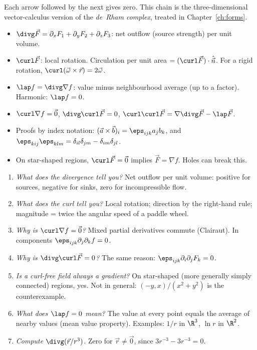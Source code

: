 Each arrow followed by the next gives zero. This chain is the three-dimensional vector-calculus version of the \emph{de~Rham complex}, treated in Chapter~\ref{ch:forms}.

\begin{summarybox}
\begin{itemize}
  \item $\divg\vec F=\partial_xF_1+\partial_yF_2+\partial_zF_3$: net outflow (source strength) per unit volume.
  \item $\curl\vec F$: local rotation. Circulation per unit area $=(\curl\vec F)\cdot\hat{\vec n}$. For a rigid rotation, $\curl(\vec\omega\times\vec r)=2\vec\omega$.
  \item $\lap f=\divg\nabla f$: value minus neighbourhood average (up to a factor). Harmonic: $\lap f=0$.
  \item $\curl\nabla f=\vec 0$, $\divg\curl\vec F=0$, $\curl\curl\vec F=\nabla\divg\vec F-\lap\vec F$.
  \item Proofs by index notation: $(\vec a\times\vec b)_i=\eps_{ijk}a_jb_k$, and $\eps_{kij}\eps_{klm}=\delta_{il}\delta_{jm}-\delta_{im}\delta_{jl}$.
  \item On star-shaped regions, $\curl\vec F=\vec 0$ implies $\vec F=\nabla f$. Holes can break this.
\end{itemize}
\end{summarybox}

\begin{interview}
\begin{enumerate}
  \item \emph{What does the divergence tell you?} Net outflow per unit volume: positive for sources, negative for sinks, zero for incompressible flow.
  \item \emph{What does the curl tell you?} Local rotation; direction by the right-hand rule; magnitude = twice the angular speed of a paddle wheel.
  \item \emph{Why is $\curl\nabla f=\vec 0$?} Mixed partial derivatives commute (Clairaut). In components $\eps_{ijk}\partial_j\partial_kf=0$.
  \item \emph{Why is $\divg\curl\vec F=0$?} The same reason: $\eps_{ijk}\partial_i\partial_jF_k=0$.
  \item \emph{Is a curl-free field always a gradient?} On star-shaped (more generally simply connected) regions, yes. Not in general: $(-y,x)/(x^2+y^2)$ is the counterexample.
  \item \emph{What does $\lap f=0$ mean?} The value at every point equals the average of nearby values (mean value property). Examples: $1/r$ in $\R^3$, $\ln r$ in $\R^2$.
  \item \emph{Compute $\divg(\vec r/r^3)$.} Zero for $\vec r\ne\vec0$, since $3r^{-3}-3r^{-3}=0$.
\end{enumerate}
\end{interview}

